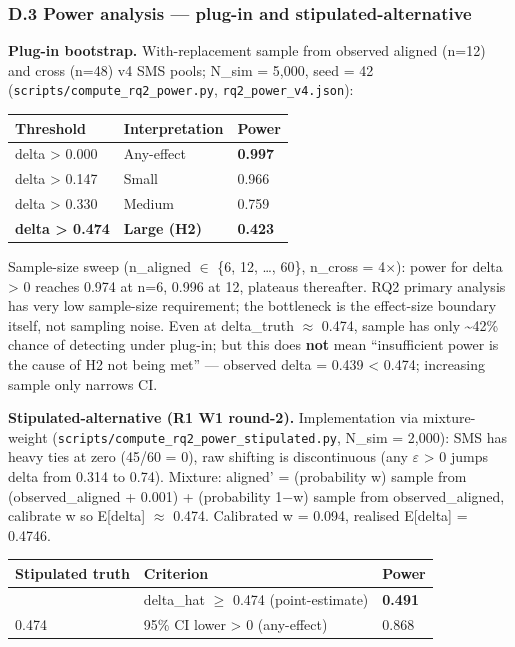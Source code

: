 \documentclass[review,12pt,authoryear]{elsarticle}
\newcounter{none}                   %
\begin{document}
\subsubsection{D.3 Power analysis --- plug-in and
stipulated-alternative}\label{d.3-power-analysis-plug-in-and-stipulated-alternative}

\textbf{Plug-in bootstrap.} With-replacement sample from observed
aligned (n=12) and cross (n=48) v4 SMS pools; N\_sim = 5,000, seed = 42
(\texttt{scripts/compute\_rq2\_power.py}, \texttt{rq2\_power\_v4.json}):

{\def\LTcaptype{none} %
\begin{longtable}[]{@{}lll@{}}
\toprule\noalign{}
Threshold & Interpretation & Power \\
\midrule\noalign{}
\endhead
\bottomrule\noalign{}
\endlastfoot
delta \textgreater{} 0.000 & Any-effect & \textbf{0.997} \\
delta \textgreater{} 0.147 & Small & 0.966 \\
delta \textgreater{} 0.330 & Medium & 0.759 \\
\textbf{delta \textgreater{} 0.474} & \textbf{Large (H2)} &
\textbf{0.423} \\
\end{longtable}
}

Sample-size sweep (n\_aligned $\in$ \{6, 12, \ldots, 60\}, n\_cross = 4$\times$):
power for delta \textgreater{} 0 reaches 0.974 at n=6, 0.996 at 12,
plateaus thereafter. RQ2 primary analysis has very low sample-size
requirement; the bottleneck is the effect-size boundary itself, not
sampling noise. Even at delta\_truth $\approx$ 0.474, sample has only
\textasciitilde42\% chance of detecting under plug-in; but this does
\textbf{not} mean ``insufficient power is the cause of H2 not being
met'' --- observed delta = 0.439 \textless{} 0.474; increasing sample
only narrows CI.

\textbf{Stipulated-alternative (R1 W1 round-2).} Implementation via
mixture-weight (\texttt{scripts/compute\_rq2\_power\_stipulated.py},
N\_sim = 2,000): SMS has heavy ties at zero (45/60 = 0), raw shifting is
discontinuous (any $\varepsilon$ \textgreater{} 0 jumps delta from 0.314 to 0.74).
Mixture: aligned' = (probability w) sample from (observed\_aligned +
0.001) + (probability 1−w) sample from observed\_aligned, calibrate w so
E{[}delta{]} $\approx$ 0.474. Calibrated w = 0.094, realised E{[}delta{]} =
0.4746.

{\def\LTcaptype{none} %
\begin{longtable}[]{@{}lll@{}}
\toprule\noalign{}
Stipulated truth & Criterion & Power \\
\midrule\noalign{}
\endhead
\bottomrule\noalign{}
\endlastfoot
0.474 & delta\_hat $\geq$ 0.474 (point-estimate) & \textbf{0.491} \\
0.474 & 95\% CI lower \textgreater{} 0 (any-effect) & 0.868 \\
\end{longtable}
}
\end{document}
